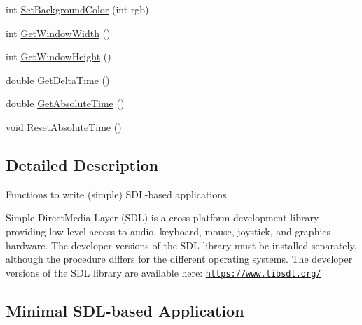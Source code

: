 \begin{DoxyCompactItemize}
\item 
int \hyperlink{group__sdl__group_gaa80de83a7c03984305662ae0ca5daa05}{Set\+Background\+Color} (int rgb)
\item 
int \hyperlink{group__sdl__group_gaa938d3f784d26ccd4ed8c2d83bbc6ab4}{Get\+Window\+Width} ()
\item 
int \hyperlink{group__sdl__group_gac27ddd893a70056c55278b33d7bd2c62}{Get\+Window\+Height} ()
\item 
double \hyperlink{group__sdl__group_gaf9e3349b29171ad58521f5a7a6238fca}{Get\+Delta\+Time} ()
\item 
double \hyperlink{group__sdl__group_ga9b9387d774c6bc63e5e3c6c91296dedb}{Get\+Absolute\+Time} ()
\item 
void \hyperlink{group__sdl__group_ga5b39467f3664fad21ce3c0f14c4506ff}{Reset\+Absolute\+Time} ()
\end{DoxyCompactItemize}


\subsection{Detailed Description}
Functions to write (simple) S\+D\+L-\/based applications. 

Simple Direct\+Media Layer (S\+DL) is a cross-\/platform development library providing low level access to audio, keyboard, mouse, joystick, and graphics hardware. The developer versions of the S\+DL library must be installed separately, although the procedure differs for the different operating systems. The developer versions of the S\+DL library are available here\+: \href{https://www.libsdl.org/}{\tt https\+://www.\+libsdl.\+org/}\hypertarget{group__sdl__group_sdl_example_sect}{}\subsection{Minimal S\+D\+L-\/based Application}\label{group__sdl__group_sdl_example_sect}

